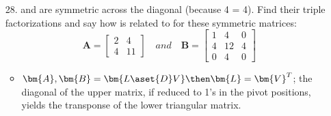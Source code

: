 \begin{itemize}
\begin{enumerate}
      \item[28.]  and  are symmetric across the diagonal (because
        4 = 4). Find their triple factorizations  and say how 
        is related to  for these symmetric matrices:
        \[%
        \bm{A} = \begin{bmatrix}
        2 & 4 \\
        4 & 11
        \end{bmatrix} \quad and \quad
        \bm{B} =
        \begin{bmatrix}
        1 & 4 & 0 \\
        4 & 12 & 4 \\
        0 & 4 & 0
        \end{bmatrix}
        \]%
      \begin{itemize}\color{foreground}
      \item {\(\bm{A}, \bm{B} = \bm{L\aset{D}V} \then \bm{L} = \bm{V}^T\)}; the
        diagonal of the upper matrix, if reduced to 1's in the pivot positions,
        yields the transponse of the lower triangular matrix.
      \end{itemize}



\end{enumerate}
\end{itemize}
